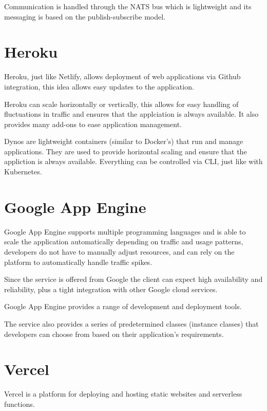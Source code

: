 Communication is handled through the NATS bus which is lightweight and its messaging is based on the publish-subscribe model.

\section{Heroku}
Heroku, just like Netlify, allows deployment of web applications via Github integration, this idea allows easy updates to the application.

Heroku can scale horizontally or vertically, this allows for easy handling of fluctuations in traffic and ensures that the applciation is always available. It also provides many add-ons to ease application management.

Dynos are lightweight containers (similar to Docker's) that run and manage applications. They are used to provide horizontal scaling and ensure that the appliction is always available. Everything can be controlled via CLI, just like with Kubernetes.

\section{Google App Engine}
Google App Engine supports multiple programming languages and is able to scale the application automatically depending on traffic and usage patterns, developers do not have to manually adjust resources, and can rely on the platform to automatically handle traffic spikes.

Since the service is offered from Google the client can expect high availability and reliability,
plus a tight integration with other Google cloud services.

Google App Engine provides a range of development and deployment tools.

The service also provides a series of predetermined classes (instance classes) that developers can choose from based on their application's requirements.

\section{Vercel}
Vercel is a platform for deploying and hosting static websites and serverless functions.
